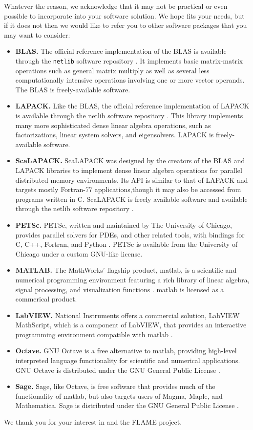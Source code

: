 Whatever the reason, we acknowledge that it may not be practical or even
possible to incorporate \libflame into your software solution.
We hope \libflame fits your needs, but if it does not then we would like to
refer you to other software packages that you may want to consider:
\begin{itemize}
\item {\bf BLAS.}
The official reference implementation of the BLAS is available through the
{\tt netlib} software repository \cite{netlibblas2008}.
It implements basic matrix-matrix operations such as general matrix multiply
as well as several less computationally intensive operations involving one
or more vector operands.
The BLAS is freely-available software.
\item {\bf LAPACK.}
Like the BLAS, the official reference implementation of LAPACK is available
through the netlib software repository \cite{netliblapack2008}.
This library implements many more sophisticated dense linear algebra
operations, such as factorizations, linear system solvers, and eigensolvers.
LAPACK is freely-available software.
\item {\bf ScaLAPACK.}
ScaLAPACK was designed by the creators of the BLAS and LAPACK libraries to
implement dense linear algebra operations for parallel distributed memory
environments.
Its API is similar to that of LAPACK and targets mostly Fortran-77
applications,though it may also be accessed from programs written in C.
ScaLAPACK is freely available software and available through the netlib
software repository \cite{netlibscalapack2008}.
\item {\bf PETSc.}
PETSc, written and maintained by The University of Chicago, provides
parallel solvers for PDEs, and other related tools, with bindings for C,
C++, Fortran, and Python \cite{petsc2008}.
PETSc is available from the University of Chicago under a custom GNU-like
license.
\item {\bf MATLAB.}
The MathWorks' flagship product, {\sc matlab}, is a scientific and numerical
programming environment featuring a rich library of linear algebra, signal
processing, and visualization functions \cite{mathworks2008}.
{\sc matlab} is licensed as a commerical product.
\item {\bf LabVIEW.}
National Instruments offers a commercial solution, LabVIEW MathScript, which
is a component of LabVIEW, that provides an interactive programming environment
compatible with {\sc matlab} \cite{ni2008}.
\item {\bf Octave.}
GNU Octave is a free alternative to {\sc matlab}, providing high-level
interpreted language functionality for scientific and numerical applications.
GNU Octave is distributed under the GNU General Public
License \cite{octave2008}.
\item {\bf Sage.}
Sage, like Octave, is free software that provides much of the functionality
of {\sc matlab}, but also targets users of Magma, Maple, and Mathematica.
Sage is distributed under the GNU General Public License \cite{sage2008}.
\end{itemize}
We thank you for your interest in \libflame and the FLAME project.



